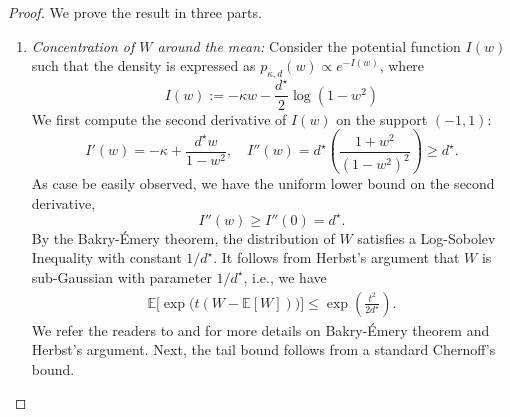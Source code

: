 \documentclass[12pt]{article}
\theoremstyle{definition}
\theoremstyle{remark}
\begin{document}
\begin{proof}
We prove the result in three parts.
\begin{enumerate}
    \item \textit{Concentration of $W$ around the mean:} Consider the potential function $I(w)$ such that the density is expressed as $p_{\kappa,d}(w) \propto e^{-I(w)}$, where
\begin{equation*}
I(w) := -\kappa w - \frac{d^\star}{2} \log(1-w^2)
\end{equation*}
We first compute the second derivative of $I(w)$ on the support $(-1, 1)$:
\begin{equation*}
I'(w) = -\kappa + \frac{d^\star w}{1-w^2}, \quad I''(w) = d^\star \left( \frac{1+w^2}{(1-w^2)^2} \right) \geq d^\star.
\end{equation*}
As case be easily observed, we have the uniform lower bound on the second derivative,
\begin{equation*}
I''(w) \ge I''(0) = d^\star.
\end{equation*}
By the Bakry-\'Emery theorem, the distribution of $W$ satisfies a Log-Sobolev Inequality with constant $ 1/d^\star$. It follows from Herbst's argument that $W$ is sub-Gaussian with parameter $ 1/d^\star$, i.e., we have
\begin{align*}
    \mathbb{E}\Big[\exp\big(t (W - \mathbb{E}[W]) \big)\Big] \le \exp\left( \frac{t^2}{2 d^\star} \right).
\end{align*}
We refer the readers to \citep[Theorem 5.2]{ledoux2001concentration} and \citep{bakry2013analysis} for more details on Bakry-\'Emery theorem and Herbst's argument. Next, the tail bound follows from a standard Chernoff's bound.


\end{enumerate}
\end{proof}
\end{document}
